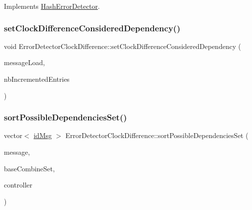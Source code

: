 Implements \hyperlink{classHashErrorDetector_ac0a25b9c1e27f98223869d11ca46d18f}{Hash\+Error\+Detector}.

\mbox{\label{classErrorDetectorClockDifference_a529b87b6eaee9041601af1ca36b51c93}} 
\subsubsection{\texorpdfstring{set\+Clock\+Difference\+Considered\+Dependency()}{setClockDifferenceConsideredDependency()}}
{\footnotesize\ttfamily void Error\+Detector\+Clock\+Difference\+::set\+Clock\+Difference\+Considered\+Dependency (\begin{DoxyParamCaption}\item[{unsigned int}]{message\+Load,  }\item[{unsigned}]{nb\+Incremented\+Entries }\end{DoxyParamCaption})}

\mbox{\label{classErrorDetectorClockDifference_a740f6bd74b30e0b194c4b64d79bb8caf}} 
\subsubsection{\texorpdfstring{sort\+Possible\+Dependencies\+Set()}{sortPossibleDependenciesSet()}}
{\footnotesize\ttfamily vector$<$ \hyperlink{structures_8h_a83a1d9a070efa5341da84cfd8e28d3e5}{id\+Msg} $>$ Error\+Detector\+Clock\+Difference\+::sort\+Possible\+Dependencies\+Set (\begin{DoxyParamCaption}\item[{const \hyperlink{structures_8h_a7e7bdc1d2fff8a9436f2f352b2711ed6}{message\+Info} \&}]{message,  }\item[{const vector$<$ \hyperlink{structures_8h_a7e7bdc1d2fff8a9436f2f352b2711ed6}{message\+Info} $>$ \&}]{base\+Combine\+Set,  }\item[{\hyperlink{classController}{Controller} $\ast$}]{controller }\end{DoxyParamCaption})\hspace{0.3cm}{\ttfamily [virtual]}}



